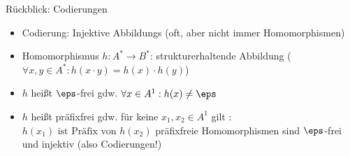 %		


\begin{frame}{Rückblick: Codierungen}
	\begin{itemize}[<+->]
		\item Codierung: Injektive Abbildungs (oft, aber nicht immer Homomorphismen)
		\item Homomorphismus $h:A^*\rightarrow B^*$: strukturerhaltende Abbildung ($\forall x,y\in A^*:h(x\cdot y) = h(x)\cdot h(y)$)
		\item $h$ heißt $\eps$-frei gdw. $\forall x\in A^1:h(x)\not = \eps$
		\item $h$ heißt präfixfrei gdw. für keine $x_1,x_2\in A^1$ gilt :$ h(x_1) \text{ ist Präfix von } h(x_2)$
		\implitem präfixfreie Homomorphismen sind $\eps$-frei und injektiv (also Codierungen!)
	\end{itemize}
\end{frame}








